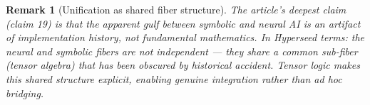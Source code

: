\documentclass[11pt,a4paper]{article}
\newtheorem{remark}[definition]{Remark}
\begin{document}
\begin{remark}[Unification as shared fiber structure]
The article's deepest claim (claim 19) is that the apparent gulf between
symbolic and neural AI is an artifact of implementation history, not
fundamental mathematics. In Hyperseed terms: the neural and symbolic
fibers are not independent --- they share a common sub-fiber (tensor
algebra) that has been obscured by historical accident. Tensor logic
makes this shared structure explicit, enabling genuine integration
rather than ad hoc bridging.
\end{remark}
\end{document}
